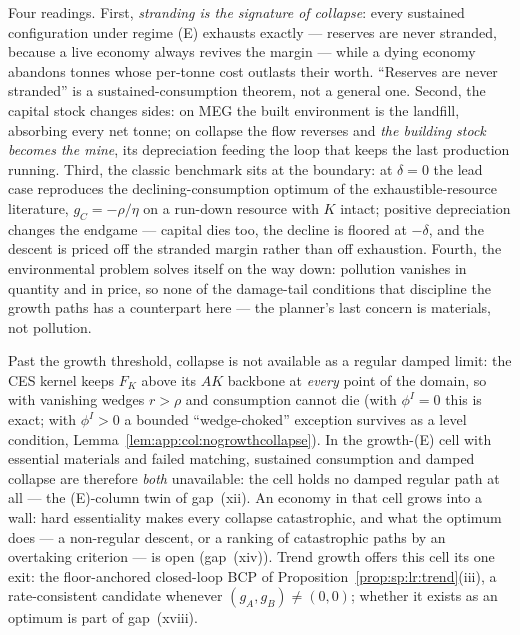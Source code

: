 Four readings. First, \emph{stranding is the signature of collapse}: every sustained
configuration under regime (E) exhausts exactly --- reserves are never stranded, because a
live economy always revives the margin --- while a dying economy abandons tonnes whose
per-tonne cost outlasts their worth. ``Reserves are never stranded'' is a
sustained-consumption theorem, not a general one. Second, the capital stock changes sides:
on MEG the built environment is the landfill, absorbing every net tonne; on collapse the flow
reverses and \emph{the building stock becomes the mine}, its depreciation feeding the loop
that keeps the last production running. Third, the classic benchmark sits at the boundary:
at $\delta=0$ the lead case reproduces the declining-consumption optimum of the
exhaustible-resource literature, $g_C=-\rho/\eta$ on a run-down resource with $K$ intact;
positive depreciation changes the endgame --- capital dies too, the decline is floored at
$-\delta$, and the descent is priced off the stranded margin rather than off exhaustion.
Fourth, the environmental problem solves itself on the way down: pollution vanishes in
quantity and in price, so none of the damage-tail conditions that discipline the growth
paths has a counterpart here --- the planner's last concern is materials, not pollution.

\begin{remark}\label{rem:sp:lr:growthcollapse}
Past the growth threshold, collapse is not available as a regular damped limit: the CES
kernel keeps $F_K$ above its $AK$ backbone at \emph{every} point of the domain, so with
vanishing wedges $r>\rho$ and consumption cannot die (with $\phi^I=0$ this is exact;
with $\phi^I>0$ a bounded ``wedge-choked'' exception survives as a level condition,
Lemma~\ref{lem:app:col:nogrowthcollapse}). In the growth-(E) cell with essential materials
and failed matching, sustained consumption and damped collapse are therefore \emph{both}
unavailable: the cell holds no damped regular path at all --- the (E)-column twin of
gap~(xii). An economy in that cell grows into a wall: hard essentiality makes every collapse
catastrophic, and what the optimum does --- a non-regular descent, or a ranking of
catastrophic paths by an overtaking criterion --- is open (gap~(xiv)). Trend growth offers
this cell its one exit: the floor-anchored closed-loop BCP of
Proposition~\ref{prop:sp:lr:trend}(iii), a rate-consistent candidate whenever
$\left(g_A,g_B\right)\ne\left(0,0\right)$; whether it exists as an optimum is part of
gap~(xviii).
\end{remark}
